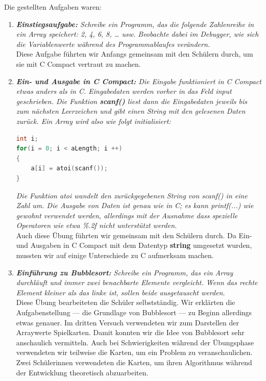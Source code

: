 Die gestellten Aufgaben waren:
\begin{enumerate}
\item \emph{\textbf{Einstiegsaufgabe:} Schreibe ein Programm, das die folgende Zahlenreihe in ein Array speichert: 2, 4, 6, 8, … usw. Beobachte dabei im Debugger, wie sich die Variablenwerte während des Programmablaufes verändern.}\\
Diese Aufgabe führten wir Anfangs gemeinsam mit den Schülern durch, um sie mit C Compact vertraut zu machen.

\item \emph{\textbf{Ein- und Ausgabe in C Compact:} Die Eingabe funktioniert in C Compact etwas anders als in C. Eingabedaten werden vorher in das Feld \glqq{}input\grqq{} geschrieben. Die Funktion \textbf{scanf()} liest dann die Eingabedaten jeweils bis zum nächsten Leerzeichen und gibt einen String mit den gelesenen Daten zurück. Ein Array wird also wie folgt initialisiert:}
\begin{lstlisting}[language=C]
int i;
for(i = 0; i < aLength; i ++)
{
    a[i] = atoi(scanf());
}
\end{lstlisting}
\emph{Die Funktion atoi wandelt den zurückgegebenen String von scanf() in eine Zahl um.
Die Ausgabe von Daten ist genau wie in C; es kann printf(...) wie gewohnt verwendet werden, allerdings mit der Ausnahme dass spezielle Operatoren wie etwa \glqq{}\%.2f\grqq{} nicht unterstützt werden.}\\
Auch diese Übung führten wir gemeinsam mit den Schülern durch. Da Ein- und Ausgaben in C Compact mit dem Datentyp \textbf{string} umgesetzt wurden, mussten wir auf einige Unterschiede zu C aufmerksam machen.

\item \emph{\textbf{Einführung zu Bubblesort: }Schreibe ein Programm, das ein Array durchläuft und immer zwei benachbarte Elemente vergleicht. Wenn das rechte Element kleiner als das linke ist, sollen beide ausgetauscht werden.}\\
Diese Übung bearbeiteten die Schüler selbstständig. Wir erklärten die Aufgabenstellung --- die Grundlage von Bubblesort --- zu Beginn allerdings etwas genauer. Im dritten Versuch verwendeten wir zum Darstellen der Arraywerte Spielkarten. Damit konnten wir die Idee von Bubblesort sehr anschaulich vermitteln. Auch bei Schwierigkeiten während der Übungsphase verwendeten wir teilweise die Karten, um ein Problem zu veranschaulichen. Zwei Schülerinnen verwendeten die Karten, um ihren Algorithmus während der Entwicklung theoretisch abzuarbeiten.


\end{enumerate}
